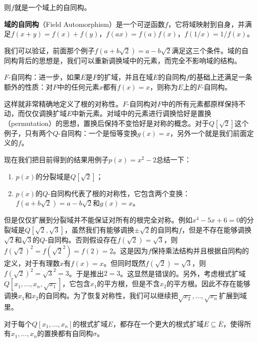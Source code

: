 \documentclass[b5paper]{ctexart}
\begin{document}
则$f$就是一个域上的自同构。

\begin{definition}
\textbf{域的自同构}（Field Automorphism）是一个可逆函数$f$，它将域映射到自身，并满足$f(x + y) = f(x) + f(y)$，$f(ax) = f(a) f(x)$，$f(1/x) = 1/f(x)$。
\end{definition}

我们可以验证，前面那个例子$f(a + b \sqrt{2}) = a - b \sqrt{2}$满足这三个条件。域的自同构背后的思想是，我们可以重新调换域中的元素，而完全不影响域的结构。

\begin{definition}
$F$-自同构：进一步，如果$E$是$F$的扩域，并且在域$E$的自同构$f$的基础上还满足一条额外的性质：对$F$中的任何元素$x$都有$f(x) = x$，则称为$E$上的$F$-自同构。
\end{definition}

这样就非常精确地定义了根的对称性。$F$-自同构对$F$中的所有元素都原样保持不动，而仅仅调换扩域$E$中新元素。对域中的元素进行调换恰好是置换（permutation）的思想，置换后保持不变恰好是对称的概念。对于$Q[\sqrt{2}]$这个例子，只有两个$Q$-自同构：一个是恒等变换$g(x) = x$，另外一个就是我们前面定义的$f$。

现在我们把目前得到的结果用例子$p(x) = x^2 - 2$总结一下：

\begin{enumerate}
\item $p(x)$的分裂域是$Q[\sqrt{2}]$；
\item $p(x)$的$Q$-自同构代表了根的对称性，它包含两个变换：$f(a + b\sqrt{2}) = a - b\sqrt{2}$和$g(x) = x$。
\end{enumerate}

但是仅仅扩展到分裂域并不能保证对所有的根完全对称。例如$x^4 - 5x + 6 = 0$的分裂域是$Q[\sqrt{2}, \sqrt{3}]$，虽然我们有能够调换$\pm \sqrt{2}$的自同构$f$，但是不存在能够调换$\sqrt{2}$和$\sqrt{3}$的$Q$-自同构。否则假设存在$f(\sqrt{2}) = \sqrt{3}$，则$f(\sqrt{2})^2 = f(\sqrt{2}^2) = f(2) = 2$。这是因为$f$保持乘法结构并且根据自同构的定义，对于有理数$x$有$f(x) = x$。但同时既然$f(\sqrt{2}) = \sqrt{3}$，则$f(\sqrt{2})^2 = \sqrt{3}^2 = 3$。于是推出$2 = 3$。这显然是错误的。另外，考虑根式扩域$Q[x_1, ..., x_n, \sqrt{x_1}]$，它包含$x_1$的平方根，但是不含$x_2$的平方根。因此不存在能够调换$x_1$和$x_2$的自同构。为了恢复对称性，我们可以继续把$\sqrt{x_2}, ..., \sqrt{x_n}$扩展到域里。

\begin{theorem}
对于每个$Q[x_1, ..., x_n]$的根式扩域$E$，都存在一个更大的根式扩域$E \subseteq \overline{E}$，使得所有$x_1, ..., x_n$的置换都有自同构$\sigma$。
\end{theorem}
\end{document}
